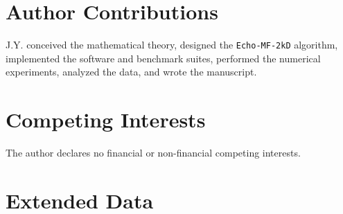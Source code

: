 \documentclass[10pt,a4paper]{article}
\begin{document}
\section*{Author Contributions}

J.Y. conceived the mathematical theory, designed the \texttt{Echo-MF-2kD} algorithm, implemented the software and benchmark suites, performed the numerical experiments, analyzed the data, and wrote the manuscript.

\section*{Competing Interests}

The author declares no financial or non-financial competing interests.

\clearpage
\section*{Extended Data}
\renewcommand{\tablename}{Extended Data Table}
\setcounter{table}{0}
\end{document}
